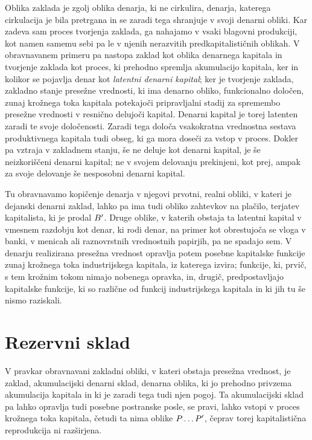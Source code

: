 \documentclass[kapital_02.tex]{subfiles}
\begin{document}
Oblika zaklada je zgolj oblika denarja, ki ne cirkulira, denarja, katerega cirkulacija je bila pretrgana in se zaradi tega shranjuje v svoji denarni obliki. Kar zadeva sam proces tvorjenja zaklada, ga nahajamo v vsaki blagovni produkciji, kot namen samemu sebi pa le v njenih nerazvitih predkapitalističnih oblikah. V obravnavanem primeru pa nastopa zaklad kot oblika denarnega kapitala in tvorjenje zaklada kot proces, ki prehodno spremlja akumulacijo kapitala, ker in kolikor se pojavlja denar kot \emph{latentni denarni kapital}; ker je tvorjenje zaklada, zakladno stanje presežne vrednosti, ki ima denarno obliko, funkcionalno določen, zunaj krožnega toka kapitala potekajoči pripravljalni stadij za spremembo presežne vrednosti v resnično delujoči kapital. Denarni kapital je torej latenten zaradi te svoje določenosti. Zaradi tega določa vsakokratna vrednostna sestava produktivnega kapitala tudi obseg, ki ga mora doseči za vstop v proces. Dokler pa vztraja v zakladnem stanju, še ne deluje kot denarni kapital, je še neizkoriščeni denarni kapital; ne v svojem delovanju prekinjeni, kot prej, ampak za svoje delovanje še nesposobni denarni kapital.

Tu obravnavamo kopičenje denarja v njegovi prvotni, realni obliki, v kateri je dejanski denarni zaklad, lahko pa ima tudi obliko zahtevkov na plačilo, terjatev kapitalista, ki \KPEstran je prodal \( B' \). Druge oblike, v katerih obstaja ta latentni kapital v vmesnem razdobju kot denar, ki rodi denar, na primer kot obrestujoča se vloga v banki, v menicah ali raznovrstnih vrednostnih papirjih, pa ne spadajo sem. V denarju realizirana presežna vrednost opravlja potem posebne kapitalske funkcije zunaj krožnega toka industrijskega kapitala, iz katerega izvira; funkcije, ki, prvič, s tem krožnim tokom nimajo nobenega opravka, in, drugič, predpostavljajo kapitalske funkcije, ki so različne od funkcij industrijskega kapitala in ki jih tu še nismo raziskali.

\section{Rezervni sklad}

V pravkar obravnavani zakladni obliki, v kateri obstaja presežna vrednost, je zaklad, akumulacijski denarni sklad, denarna oblika, ki jo prehodno privzema akumulacija kapitala in ki je zaradi tega tudi njen pogoj. Ta akumulacijski sklad pa lahko opravlja tudi posebne postranske posle, se pravi, lahko vstopi v proces krožnega toka kapitala, četudi ta nima oblike \( P \dots P' \), čeprav torej kapitalistična reprodukcija ni razširjena.
\end{document}
